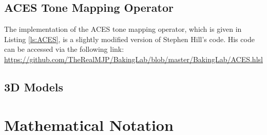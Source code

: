 \begin{appendices}
\section{ACES Tone Mapping Operator} \label{ACESExternalMaterial}

The implementation of the ACES tone mapping operator, which is given in Listing \ref{ls:ACES}, is a slightly modified version of Stephen Hill's code. His code can be accessed via the following link: \url{https://github.com/TheRealMJP/BakingLab/blob/master/BakingLab/ACES.hlsl}

\section{3D Models}


%
%
\chapter{Mathematical Notation} \label{MathematicalNotation}


\end{appendices}
